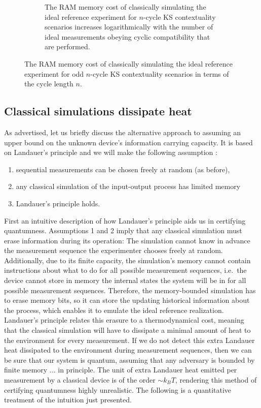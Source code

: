 \begin{figure}
\begin{subfigure}{\textwidth}
            \caption{The RAM memory cost of classically simulating the ideal reference experiment for $n$-cycle KS contextuality scenarios increases logarithmically with the number of ideal measurements obeying cyclic compatibility that are performed.}
        \end{subfigure}
        \caption{The RAM memory cost of classically simulating the ideal reference experiment for odd $n$-cycle KS contextuality scenarios in terms of the cycle length $n$.}
        \label{fig:ncycleRAM}
\end{figure}


\subsection{Classical simulations dissipate heat}
\label{sec:landauer}
As advertised, let us briefly discuss the alternative approach to assuming an upper bound on the unknown device's information carrying capacity. It is based on Landauer's principle and we will make the following assumption \cite{Cabello2016}:
\begin{enumerate}
    \item sequential measurements can be chosen freely at random (as before),
    \item any classical simulation of the input-output process has limited memory
    \item Landauer's principle holds.
\end{enumerate}

First an intuitive description of how Landauer's principle aids us in certifying quantumness.
Assumptions 1 and 2 imply that any classical simulation must erase information during its operation: The simulation cannot know in advance the measurement sequence the experimenter chooses freely at random. Additionally, due to its finite capacity, the simulation's memory cannot contain instructions about what to do for all possible measurement sequences, i.e.\ the device cannot store in memory the internal states the system will be in for all possible measurement sequences. Therefore, the memory-bounded simulation has to erase memory bits, so it can store the updating historical information about the process, which enables it to emulate the ideal reference realization. Landauer's principle relates this erasure to a thermodynamical cost, meaning that the classical simulation will have to dissipate a minimal amount of heat to the environment for every measurement. If we do not detect this extra Landauer heat dissipated to the environment during measurement sequences, then we can be sure that our system is quantum, assuming that any adversary is bounded by finite memory $\dots$ in principle. The unit of extra Landauer heat emitted per measurement by a classical device is of the order $\sim k_B T$, rendering this method of certifying quantumness highly unrealistic. The following is a quantitative treatment of the intuition just presented.

